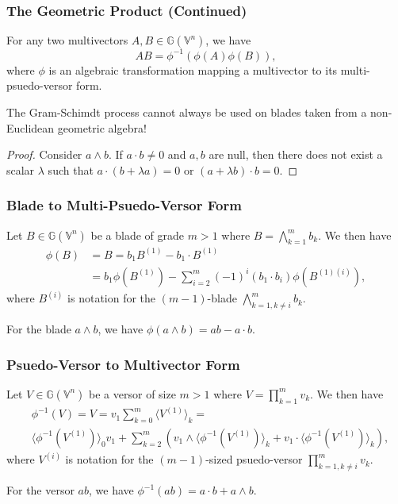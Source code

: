 \documentclass{beamer}
\newcommand{\G}{\mathbb{G}}
\newcommand{\V}{\mathbb{V}}
\begin{document}
\begin{frame}
\frametitle{The Geometric Product (Continued)}
\begin{example}
For any two multivectors $A,B\in\G(\V^n)$, we have
\begin{equation*}
AB = \phi^{-1}(\phi(A)\phi(B)),
\end{equation*}
where $\phi$ is an algebraic transformation mapping a multivector to its multi-psuedo-versor form.
\end{example}
\begin{lemma}
The Gram-Schimdt process cannot always be used on blades taken from
a \alert{non-Euclidean} geometric algebra!
\end{lemma}
\begin{proof}
Consider $a\wedge b$.  If $a\cdot b\neq 0$ and $a,b$ are null, then there does not exist a
scalar $\lambda$ such that $a\cdot(b+\lambda a)=0$ or $(a+\lambda b)\cdot b=0$.
\end{proof}
\end{frame}

\begin{frame}
\frametitle{Blade to Multi-Psuedo-Versor Form}
Let $B\in\G(\V^n)$ be a blade of grade $m>1$ where $B=\bigwedge_{k=1}^m b_k$.
We then have
\begin{align*}
\phi(B) &= B = b_1 B^{(1)} - b_1\cdot B^{(1)} \\
& = b_1 \phi(B^{(1)}) - \sum_{i=2}^m(-1)^i (b_1\cdot b_i)\phi(B^{(1)(i)}),
\end{align*}
where $B^{(i)}$ is notation for the $(m-1)$-blade $\bigwedge_{k=1,k\neq i}^m b_k$.
\begin{example}
For the blade $a\wedge b$, we have $\phi(a\wedge b)=ab-a\cdot b$.
\end{example}
\end{frame}

\begin{frame}
\frametitle{Psuedo-Versor to Multivector Form}
Let $V\in\G(\V^n)$ be a versor of size $m>1$ where $V=\prod_{k=1}^m v_k$.
We then have
\begin{align*}
 & \phi^{-1}(V) = V = v_1\sum_{k=0}^m\langle V^{(1)}\rangle_k = \\
 & \langle \phi^{-1}(V^{(1)})\rangle_0 v_1+\sum_{k=2}^m\left(
v_1\wedge\langle \phi^{-1}(V^{(1)})\rangle_k + v_1\cdot\langle \phi^{-1}(V^{(1)})\rangle_k\right),
\end{align*}
where $V^{(i)}$ is notation for the $(m-1)$-sized psuedo-versor $\prod_{k=1,k\neq i}^m v_k$.
\begin{example}
For the versor $ab$, we have $\phi^{-1}(ab)=a\cdot b+a\wedge b$.
\end{example}
\end{frame}
\end{document}
